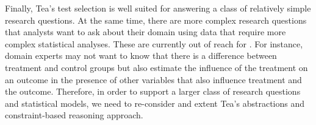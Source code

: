 
Finally, Tea's test selection is well suited for answering a class of relatively simple
research questions. At the same time, there are more complex research questions
that analysts want to ask about their domain using data that require more
complex statistical analyses. These are currently out of reach for \tea. For
instance, domain experts may not want to know that there is a difference between
treatment and control groups but also estimate the influence of the treatment on
an outcome in the presence of other variables that also influence treatment and
the outcome. Therefore, in order to support a larger class of research questions
and statistical models, we need to re-consider and extent Tea's abstractions and
constraint-based reasoning approach. 

\begin{comment}
Lessons learned

Why constraints? are they really necessary?

- inflated alpha
- inherent tension in executing multiple statistical tests vs. sensitivity


Multiple testing

Design 

Validity 
\end{comment}


